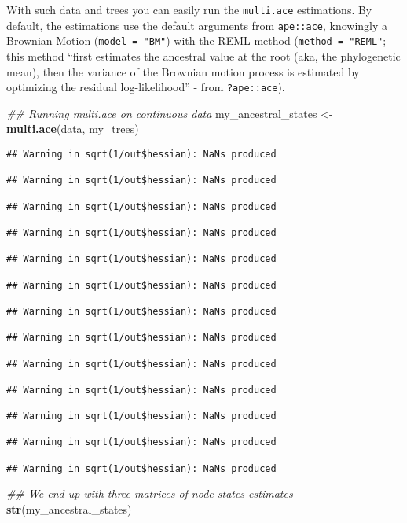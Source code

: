 \documentclass[
]{book}
\newenvironment{Shaded}{\begin{snugshade}}{\end{snugshade}}
\newcommand{\CommentTok}[1]{\textcolor[rgb]{0.56,0.35,0.01}{\textit{#1}}}
\newcommand{\KeywordTok}[1]{\textcolor[rgb]{0.13,0.29,0.53}{\textbf{#1}}}
\newcommand{\NormalTok}[1]{#1}
\newcommand{\StringTok}[1]{\textcolor[rgb]{0.31,0.60,0.02}{#1}}
\begin{document}
With such data and trees you can easily run the \texttt{multi.ace} estimations.
By default, the estimations use the default arguments from \texttt{ape::ace}, knowingly a Brownian Motion (\texttt{model\ =\ "BM"}) with the REML method (\texttt{method\ =\ "REML"}; this method ``first estimates the ancestral value at the root (aka, the phylogenetic mean), then the variance of the Brownian motion process is estimated by optimizing the residual log-likelihood'' - from \texttt{?ape::ace}).

\begin{Shaded}
\begin{Highlighting}[]
\CommentTok{\#\# Running multi.ace on continuous data}
\NormalTok{my\_ancestral\_states \textless{}{-}}\StringTok{ }\KeywordTok{multi.ace}\NormalTok{(data, my\_trees)}
\end{Highlighting}
\end{Shaded}

\begin{verbatim}
## Warning in sqrt(1/out$hessian): NaNs produced

## Warning in sqrt(1/out$hessian): NaNs produced

## Warning in sqrt(1/out$hessian): NaNs produced

## Warning in sqrt(1/out$hessian): NaNs produced

## Warning in sqrt(1/out$hessian): NaNs produced

## Warning in sqrt(1/out$hessian): NaNs produced

## Warning in sqrt(1/out$hessian): NaNs produced

## Warning in sqrt(1/out$hessian): NaNs produced

## Warning in sqrt(1/out$hessian): NaNs produced

## Warning in sqrt(1/out$hessian): NaNs produced

## Warning in sqrt(1/out$hessian): NaNs produced

## Warning in sqrt(1/out$hessian): NaNs produced

## Warning in sqrt(1/out$hessian): NaNs produced
\end{verbatim}

\begin{Shaded}
\begin{Highlighting}[]
\CommentTok{\#\# We end up with three matrices of node states estimates}
\KeywordTok{str}\NormalTok{(my\_ancestral\_states)}
\end{Highlighting}
\end{Shaded}
\end{document}
